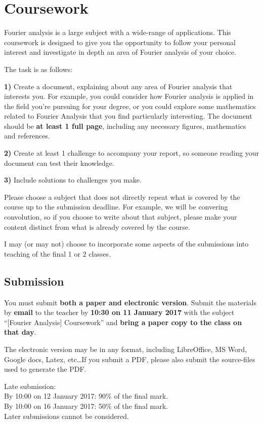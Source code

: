 \newpage
\section{Coursework}
Fourier analysis is a large subject with a wide-range of applications. This coursework is designed to give you the opportunity to follow your personal interest and investigate in depth an area of Fourier analysis of your choice.

The task is as follows:

\textbf{1)} Create a document, explaining about any area of Fourier analysis that interests you. For example, you could consider how Fourier analysis is applied in the field you're pursuing for your degree, or you could explore some mathematics related to Fourier Analysis that you find particularly interesting. The document should be \textbf{at least 1 full page}, including any necessary figures, mathematics and references.

\textbf{2)} Create at least 1 challenge to accompany your report, so someone reading your document can test their knowledge.

\textbf{3)} Include solutions to challenges you make.

Please choose a subject that does not directly repeat what is covered by the course up to the submission deadline. For example, we will be convering convolution, so if you choose to write about that subject, please make your content distinct from what is already covered by the course.

I may (or may not) choose to incorporate some aspects of the submissions into teaching of the final 1 or 2 classes.

\subsection{Submission}
You must submit \textbf{both a paper and electronic version}. Submit the materials by \textbf{email} to the teacher by \textbf{10:30 on 11 January 2017} with the subject ``[Fourier Analysis] Coursework'' and \textbf{bring a paper copy to the class on that day}.

The electronic version may be in any format, including LibreOffice, MS Word, Google docs, Latex, etc\ldots If you submit a PDF, please also submit the source-files used to generate the PDF.

Late submission:\\
By 10:00 on 12 January 2017: 90\% of the final mark.\\
By 10:00 on 16 January 2017: 50\% of the final mark.\\
Later submissions cannot be considered.

